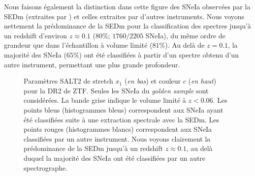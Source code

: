 \documentclass[../main/main.tex]{subfiles}
\begin{document}
Nous faisons également la distinction dans cette figure des SNeIa
observées par la SEDm (extraites par \hypergal) et celles extraites par
d'autres instruments. Nous voyons nettement la prédominance de la SEDm pour
la classification des spectres
jusqu'à un redshift d'environ $z\approx0.1$ ($80\%$; $1760/2205$ SNeIa),
du même ordre de grandeur que dans
l'échantillon à volume limité ($81\%$). Au delà de $z=0.1$, la majorité
des SNeIa ($65\%$) ont été classifiées à partir d'un spectre obtenu d'un autre
instrument, permettant une plus
grande profondeur.
\begin{figure}[ht]
  \centering
  \caption[Paramètres SALT2 de stretch et couleur pour la DR2 de
  ZTF]{Paramètres SALT2 de stretch $x_{1}$ (\emph{en bas}) et couleur $c$
    (\emph{en haut}) pour la DR2 de ZTF. Seules les SNeIa du
    \textit{golden sample}
    sont considérées. La bande grise indique le
    volume limité à $z<0.06$. Les points bleus (histogrammes bleus)
    correspondent aux SNeIa ayant été classifiées suite à une extraction
    spectrale avec la SEDm. Les points rouges (histogrammes blancs)
    correspondent aux SNeIa classifiées par un autre instrument. Nous
    voyons clairement la prédominance de la SEDm jusqu'à un redshift
    $z\approx0.1$, au delà duquel la majorité des SNeIa ont été
    classifiées par un autre spectrographe.}
  \label{fig:ztfdr2salt}
\end{figure}
\end{document}
